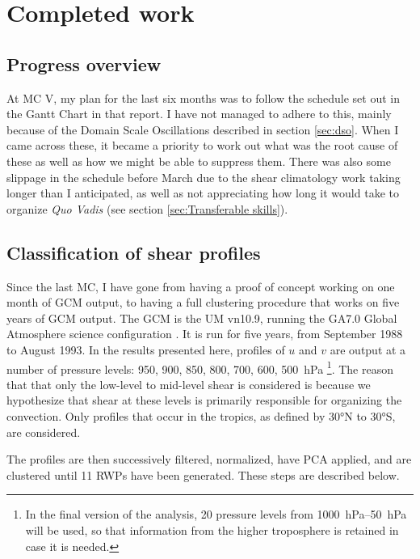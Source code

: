 \documentclass[11pt,a4paper]{article}
\newcommand\todo[1]{\textbf{TODO: #1}}
\begin{document}

\section{Completed work}
\label{sec:Completed work}


\subsection{Progress overview}
\label{sec:Progress overview}

At MC V, my plan for the last six months was to follow the schedule set out in the Gantt Chart in that report. I have not managed to adhere to this, mainly because of the Domain Scale Oscillations described in section \ref{sec:dso}. When I came across these, it became a priority to work out what was the root cause of these as well as how we might be able to suppress them. There was also some slippage in the schedule before March due to the shear climatology work taking longer than I anticipated, as well as not appreciating how long it would take to organize \textit{Quo Vadis} (see section \ref{sec:Transferable skills}).


\subsection{Classification of shear profiles}
\label{sec:Classification of shear profiles}
Since the last MC, I have gone from having a proof of concept working on one month of GCM output, to having a full clustering procedure that works on five years of GCM output. The GCM is the UM vn10.9, running the GA7.0 Global Atmosphere science configuration \parencite{walters2018met}. It is run for five years, from September 1988 to August 1993. In the results presented here, profiles of $u$ and $v$ are output at a number of pressure levels: \SI{950}{}, \SI{900}{}, \SI{850}{}, \SI{800}{}, \SI{700}{}, \SI{600}{}, \SI{500}{hPa} \footnote{In the final version of the analysis, 20 pressure levels from \SIrange{1000}{50}{hPa} will be used, so that information from the higher troposphere is retained in case it is needed.}. The reason that that only the low-level to mid-level shear is considered is because we hypothesize that shear at these levels is primarily responsible for organizing the convection. Only profiles that occur in the tropics, as defined by 30\si{\degree}N to 30\si{\degree}S, are considered.

The profiles are then successively filtered, normalized, have PCA applied, and are clustered until 11 RWPs have been generated. These steps are described below.
\end{document}
